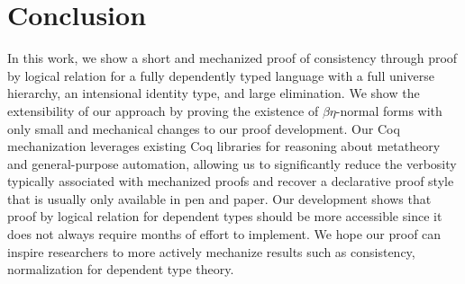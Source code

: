 \documentclass[acmsmall,screen=true,
\ifpublic review=false\else,review=true\fi
  ,anonymous=\ifanonymous true\else false\fi]{acmart}
\begin{document}
\section{Conclusion}
\label{sec:conclusion}
In this work, we show a short and mechanized proof of consistency
through proof by logical relation for a fully dependently typed
language with a full universe hierarchy, an intensional identity type,
and large elimination. We show the extensibility of our approach by
proving the existence of $\beta\eta$-normal forms with only small
and mechanical changes to our proof development. Our Coq mechanization
leverages existing Coq libraries for reasoning about metatheory and
general-purpose automation, allowing us to significantly reduce the
verbosity typically associated with mechanized proofs and recover a
declarative proof style that is usually only available in pen and
paper. Our development shows that proof by logical relation for
dependent types should be more accessible since it does not always
require months of effort to implement. We hope our proof can inspire
researchers to more actively mechanize results such as consistency,
normalization for dependent type theory.











\end{document}
